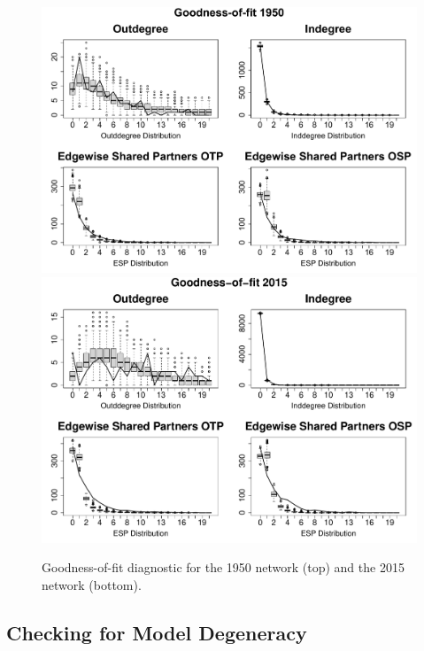 \documentclass[headsepline=true, abstracton]{scrartcl}
\begin{document}
 \begin{figure}[H]
 \begin{center}
\includegraphics[width=13.8cm]{GOF_1950}\\
\vspace{1cm}
\includegraphics[width=13.8cm]{GOF_2015}
\vspace{0.1cm}
\caption{Goodness-of-fit diagnostic for the 1950 network (top) and the 2015 network (bottom).}
 \label{GOF}
\vspace{-.25cm}
\end{center}
\end{figure} 


\subsection{Checking for Model Degeneracy}
\end{document}
